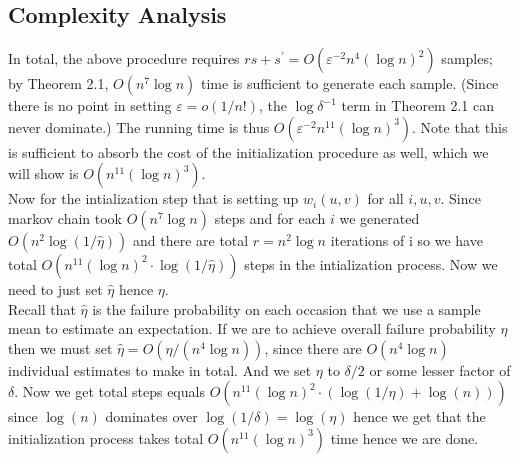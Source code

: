 \subsection{Complexity Analysis }
\begin{flushleft}
	In total, the above procedure requires $r s+s^{\prime}=O\left(\varepsilon^{-2} n^4(\log n)^2\right)$ samples; by Theorem 2.1, $O\left(n^7 \log n\right)$ time is sufficient to generate each sample. (Since there is no point in setting $\varepsilon=o(1 / n!)$, the $\log \delta^{-1}$ term in Theorem 2.1 can never dominate.) The running time is thus $O\left(\varepsilon^{-2} n^{11}(\log n)^3\right)$. Note that this is sufficient to absorb the cost of the initialization procedure as well, which we will show is $O\left(n^{11}(\log n)^3\right)$.\\
	Now for the intialization step that is setting up $w_i(u,v)$ for all $i,u,v$.
	Since markov chain took $O(n^7 \log n )$ steps and for each $i$ we generated $O(n^2\log(1/\hat{\eta}))$ and there are total $r=n^2 \log{n}$ iterations of i so we have total $O(n^{11} (\log{n})^2 \cdot \log(1/\hat{\eta}))$ steps in the intialization process. Now we need to just set $\hat{\eta}$ hence $\eta$.\\
	Recall that $\hat{\eta}$ is the failure probability on each occasion that we use a sample mean to estimate an expectation. If we are to achieve overall failure probability $\eta$ then we must set $\hat{\eta}=O\left(\eta /\left(n^4 \log n\right)\right)$, since there are $O\left(n^4 \log n\right)$ individual estimates to make in total. And we set $\eta$ to $\delta/2$ or some lesser factor of $\delta$. Now we get total steps equals
	$O(n^{11} (\log{n})^2 \cdot (\log(1/\eta)+ \log(n)))$ since $\log(n)$ dominates over $\log(1/\delta)=\log(\eta)$ hence we get that the initialization process takes total $O\left(n^{11}(\log n)^3\right)$ time hence we are done.
\end{flushleft}
